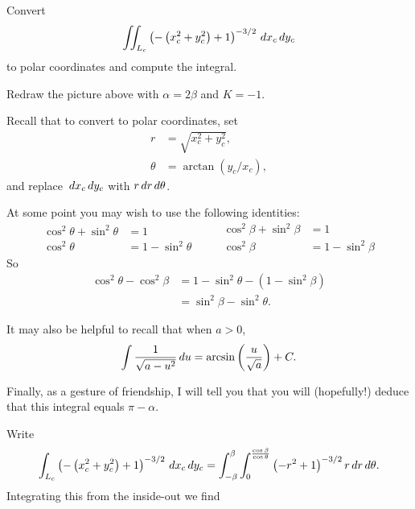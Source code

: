 \documentclass[newpage,hints,12pt,nooutcomes,noauthor,hints,handout]{ximera}
\begin{document}
\begin{problem}
  Convert
  \[
  \iint_{L_c} \left(-\left(x_c^2+y_c^2\right)+1\right)^{-3/2} \,d x_c\,d y_c
  \]
  to polar coordinates and compute the integral.
  \begin{hint}
    Redraw the picture above with $\alpha = 2\beta$ and $K=-1$.
  \end{hint}
  \begin{hint}
    Recall that to convert to polar coordinates, set
    \begin{align*}
      r &= \sqrt{x_c^2+y_c^2},\\
      \theta &= \arctan(y_c/x_c),
    \end{align*}
    and replace $\,d x_c\,d y_c$ with $r\,d r\,d \theta$.
  \end{hint}
  \begin{hint}
    At some point you may wish to use the following identities:
    \[
    \begin{split}
      \cos^2\theta + \sin^2\theta &=1\\
      \cos^2\theta &= 1-\sin^2\theta
    \end{split}
    \qquad
    \begin{split}
      \cos^2\beta + \sin^2\beta &=1\\
      \cos^2\beta &= 1-\sin^2\beta
    \end{split}
    \]
    So
    \begin{align*}
      \cos^2\theta - \cos^2\beta &= 1 - \sin^2\theta - \left(1-\sin^2\beta\right)\\
      &= \sin^2\beta - \sin^2\theta.       
    \end{align*}
  \end{hint}
  \begin{hint}
    It may also be helpful to recall that when $a>0$,
    \[
    \int \frac{1}{\sqrt{a - u^2}} \,d u = \arcsin\left(\frac{u}{\sqrt{a}}\right) + C.
    \]
  \end{hint}
  \begin{hint}
    Finally, as a gesture of friendship, I will tell you that you will
    (hopefully!) deduce that this integral equals $\pi-\alpha$.
  \end{hint}
  \begin{freeResponse}
    Write
    \[
    \int_{L_c} \left(-\left(x_c^2+y_c^2\right)+1\right)^{-3/2} \,d x_c\,d y_c
    = \int_{-\beta}^\beta \int_0^{\frac{\cos \beta}{\cos\theta}}\left(-r^2+1\right)^{-3/2} r\,d r\,d \theta.
    \]
    Integrating this from the inside-out we find
    \begin{align*}

\end{align*}
\end{freeResponse}
\end{problem}
\end{document}
